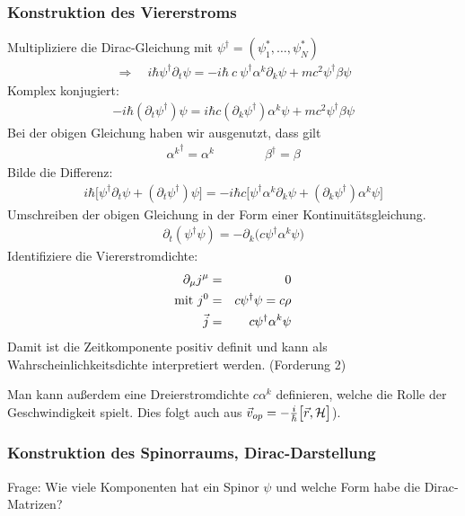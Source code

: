\subsubsection{Konstruktion des Viererstroms}
Multipliziere die Dirac-Gleichung mit $\psi^\dagger = (\psi_1^*, \dots,\psi_N^*)$
\begin{eqnarray*} 
	\Rightarrow\quad i\hbar \psi^\dagger \partial_t \psi = - i \hbar \ c \ \psi^\dagger \alpha^k \partial_k \psi + m c^2\psi^\dagger \beta \psi
\end{eqnarray*}
Komplex konjugiert:
\begin{eqnarray*} 
	-i \hbar (\partial_t \psi^\dagger) \psi  = i\hbar c ( \partial_k \psi^\dagger) \alpha^k \psi + m c^2 \psi^\dagger \beta \psi
\end{eqnarray*}
Bei der obigen Gleichung haben wir ausgenutzt, dass gilt
\begin{eqnarray*} 
	{\alpha^k}^\dagger = \alpha ^k \qquad \qquad \beta ^\dagger = \beta
\end{eqnarray*}
Bilde die Differenz:
\begin{eqnarray*}
i\hbar \Big [ \psi^ \dagger \partial_ t \psi + (\partial_t \psi^\dagger) \psi\Big] = - i \hbar c \Big [ \psi^\dagger \alpha ^k \partial_k \psi + (\partial_k \psi^\dagger) \alpha^k \psi \Big]
\end{eqnarray*}
Umschreiben der obigen Gleichung in der Form einer Kontinuitätsgleichung.
\begin{eqnarray*} \partial_t (\psi^\dagger \psi) = - \partial_k \Big(c \psi^\dagger\alpha^k \psi\Big) \end{eqnarray*}
Identifiziere die Viererstromdichte:
\begin{eqnarray*}
\partial_{\mu} j^{\mu} &=& 0\\
\text{mit}\  j^0 &=& c \psi^\dagger\psi = c \rho\\
\vec j &=& c \psi^\dagger \alpha^k \psi
\end{eqnarray*}
Damit ist die Zeitkomponente positiv definit und kann als Wahrscheinlichkeitsdichte interpretiert werden. (Forderung 2)

Man kann außerdem eine Dreierstromdichte $c \alpha^k$ definieren, welche die Rolle der Geschwindigkeit spielt. Dies folgt auch aus $\vec v_{o p} = -\frac i {\hbar} \big [ \vec r, \mathcal H  \big]$).

\subsubsection{Konstruktion des Spinorraums, Dirac-Darstellung}
Frage: Wie viele Komponenten hat ein Spinor $\psi$ und welche Form habe die Dirac-Matrizen? 


